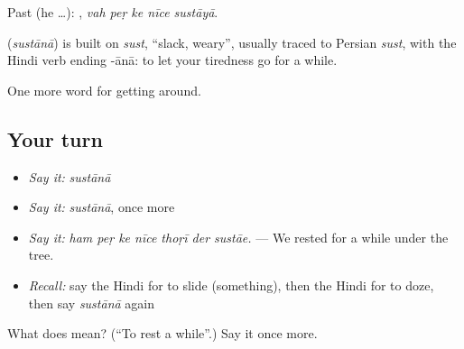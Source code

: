 Past (he …):     , \emph{vah peṛ ke nīce sustāyā}.

\begin{cousinweb}
\textbf{} (\emph{sustānā}) is built on \emph{sust}, \textquotedblleft{}slack, weary\textquotedblright{}, usually traced to Persian \emph{sust}, with the Hindi verb ending -ānā: to let your tiredness go for a while.
\end{cousinweb}

\begin{grammarlens}[title={What you've built}]
One more word for getting around.
\end{grammarlens}

\subsection*{Your turn}
\begin{itemize}
\raggedright
  \item \emph{Say it:} \emph{sustānā}
  \item \emph{Say it:} \emph{sustānā}, once more
  \item \emph{Say it:} \emph{ham peṛ ke nīce thoṛī der sustāe.} — We rested for a while under the tree.
  \item \emph{Recall:} say the Hindi for to slide (something), then the Hindi for to doze, then say \emph{sustānā} again
\end{itemize}

\begin{tcolorbox}[breakable,colback=teal!4,colframe=teal!35!black,title={Before you move on}]
What does  mean? (\textquotedblleft{}To rest a while\textquotedblright{}.) Say it once more.
\end{tcolorbox}
